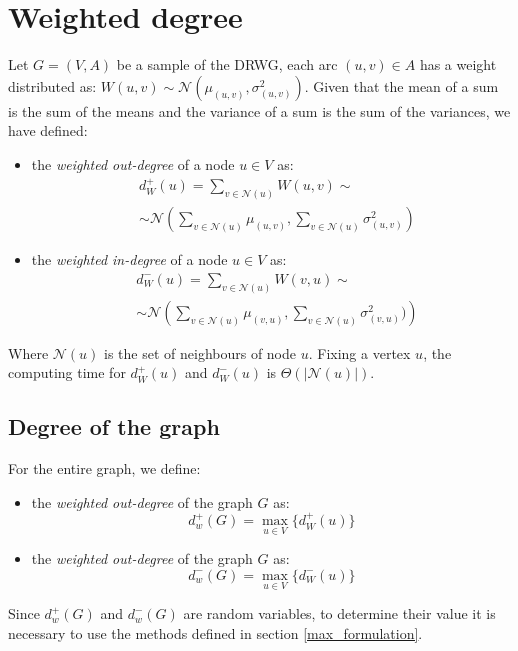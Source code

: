 \section{Weighted degree}\label{weighted_degree}
Let \( G = (V, A) \) be a sample of the DRWG, each arc \( (u, v) \in A \) has a weight distributed as: $W(u, v) \sim \mathcal{N}(\mu_{(u, v)}, \sigma^2_{(u, v)})$.
Given that the mean of a sum is the sum of the means and the variance of a sum is the sum of the variances, we have defined:
\begin{itemize}
	\item the \textit{weighted out-degree} of a node $u\in V$ as:
	\begin{align*}
		&d_W^+(u) = \sum_{v \in \mathcal{N}(u)} W(u, v) \sim \\
		&\sim \mathcal{N} \left( \sum_{v \in \mathcal{N}(u)} \mu_{(u, v)}, \sum_{v \in \mathcal{N}(u)} \sigma^2_{(u, v)}\right)
	\end{align*}
	\item the \textit{weighted in-degree} of a node $u\in V$ as:
	\begin{align*}
		&d_W^-(u) = \sum_{v \in \mathcal{N}(u)} W(v, u) \sim \\
		&\sim \mathcal{N}\left(\sum_{v \in \mathcal{N}(u)} \mu_{(v, u)}, \sum_{v \in \mathcal{N}(u)} \sigma^2_{(v, u)})\right)
	\end{align*}
\end{itemize}

Where $\mathcal{N}(u)$ is the set of neighbours of node $u$.
Fixing a vertex $u$, the computing time for $d_W^+(u)$ and $d_W^-(u)$ is $\Theta(|\mathcal{N}(u)|)$.

\subsection{Degree of the graph}
For the entire graph, we define:
\begin{itemize}
	\item the \textit{weighted out-degree} of the graph $G$ as:
	$$d^+_w(G) = \max_{u\in V}\{d_W^+(u)\}$$
	\item the \textit{weighted out-degree} of the graph $G$ as:
	$$d^-_w(G) = \max_{u\in V}\{d_W^-(u)\}$$
\end{itemize}
Since $d^+_w(G)$ and $d^-_w(G)$ are random variables, to determine their value it is necessary to use the methods defined in section \ref{max_formulation}.